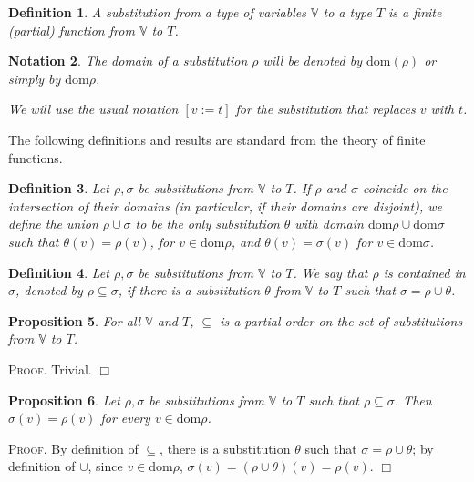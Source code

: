 \documentclass{article}
\newtheorem{definition}{Definition}[section]
\newtheorem{proposition}[definition]{Proposition}
\newtheorem{notation}[definition]{Notation}
\newenvironment{proof}{\smallskip\textsc{Proof.}}{\hspace*{\fill}$\Box$}
\newcommand{\V}{{\mathbb V}}
\newcommand{\dom}{\ensuremath{\mathrm{dom}}}
\begin{document}
\begin{definition} A \emph{substitution} from a type of variables $\V$
to a type $T$ is a finite (partial) function from $\V$ to $T$.
\end{definition}

\begin{notation}
The domain of a substitution $\rho$ will be denoted by $\dom(\rho)$ or
simply by $\dom\rho$.

We will use the usual notation $[v:=t]$ for the substitution that
replaces $v$ with $t$.
\end{notation}

The following definitions and results are standard from the theory of
finite functions.

\begin{definition} Let $\rho,\sigma$ be substitutions from $\V$ to $T$.
If $\rho$ and $\sigma$ coincide on the intersection of their domains
(in particular, if their domains are disjoint), we define the
\emph{union} $\rho\cup\sigma$ to be the only substitution $\theta$
with domain $\dom\rho\cup\dom\sigma$ such that $\theta(v)=\rho(v)$,
for $v\in\dom\rho$, and $\theta(v)=\sigma(v)$ for $v\in\dom\sigma$.
\end{definition}

\begin{definition}\label{subst:incl} Let $\rho,\sigma$ be substitutions
from $\V$ to $T$.  We say that $\rho$ \emph{is contained} in $\sigma$, denoted
by $\rho\subseteq\sigma$, if there is a substitution $\theta$ from $\V$
to $T$ such that $\sigma=\rho\cup\theta$.
\end{definition}

\begin{proposition}\label{subst:incl:props}
For all $\V$ and $T$, $\subseteq$ is a partial order on the set of
substitutions from $\V$ to $T$.
\end{proposition}
\begin{proof} Trivial.
\end{proof}

\begin{proposition}\label{subst:incl:wdef}
Let $\rho,\sigma$ be substitutions from $\V$ to $T$ such that
$\rho\subseteq\sigma$.  Then $\sigma(v)=\rho(v)$ for every
$v\in\dom\rho$.
\end{proposition}
\begin{proof} By definition of $\subseteq$, there is a substitution $\theta$
such that $\sigma=\rho\cup\theta$; by definition of $\cup$, since
$v\in\dom\rho$, $\sigma(v)=(\rho\cup\theta)(v)=\rho(v)$.
\end{proof}
\end{document}
